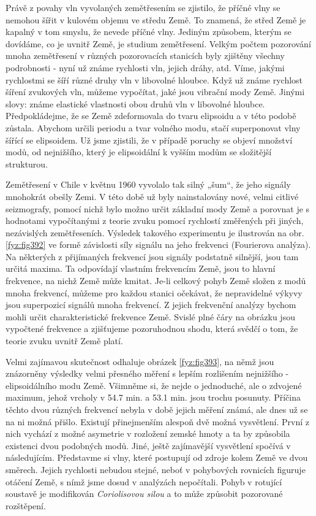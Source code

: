   Právě z povahy vln vyvolaných zemětřesením se zjistilo, že příčné vlny se nemohou šířit v kulovém 
  objemu ve středu Země. To znamená, že střed Země je kapalný v tom smyslu, že nevede příčné vlny. 
  Jediným způsobem, kterým se dovídáme, co je uvnitř Země, je studium zemětřesení. Velkým počtem 
  pozorování mnoha zemětřesení v různých pozorovacích stanicích byly zjištěny všechny podrobnosti - 
  nyní už známe rychlosti vln, jejich dráhy, atd. Víme, jakými rychlostmi se šíří různé druhy vln v 
  libovolné hloubce. Když už známe rychlost šíření zvukových vln, můžeme vypočítat, jaké jsou 
  vibrační mody Země. Jinými slovy: známe elastické vlastnosti obou druhů vln v libovolné hloubce. 
  Předpokládejme, že se Země zdeformovala do tvaru elipsoidu a v této podobě zůstala. Abychom 
  určili periodu a tvar volného modu, stačí superponovat vlny šířící se elipsoidem. Už jsme 
  zjistili, že v případě poruchy se objeví množství modů, od nejnižšího, který je elipsoidální k 
  vyšším modům se složitější strukturou.
  
  Zemětřesení v Chile v květnu 1960 vyvolalo tak silný „šum“, že jeho signály mnohokrát obešly 
  Zemi. V této době už byly nainstalovány nové, velmi citlivé seizmografy, pomocí nichž bylo možno 
  určit základní mody Země a porovnat je s hodnotami vypočítanými z teorie zvuku pomocí rychlostí 
  změřených při jiných, nezávislých zemětřeseních. Výsledek takového experimentu je ilustrován na 
  obr. \ref{fyz:fig392} ve formě závislosti síly signálu na jeho frekvenci (Fourierova analýza). Na 
  některých z přijímaných frekvencí jsou signály podstatně silnější, jsou tam určitá maxima. Ta 
  odpovídají vlastním frekvencím Země, jsou to hlavní frekvence, na nichž Země může kmitat. Je-li 
  celkový pohyb Země složen z modů mnoha frekvencí, můžeme pro každou stanici očekávat, že 
  nepravidelné výkyvy jsou superpozicí signálů mnoha frekvencí. Z jejich frekvenční analýzy bychom 
  mohli určit charakteristické frekvence Země. Svislé plné čáry na obrázku jsou vypočtené frekvence 
  a zjišťujeme pozoruhodnou shodu, která svědčí o tom, že teorie zvuku uvnitř Země platí.
  
  Velmi zajímavou skutečnost odhaluje obrázek \ref{fyz:fig393}, na němž jsou znázorněny výsledky 
  velmi přesného měření s lepším rozlišením nejnižšího - elipsoidálního modu Země. Všimněme si, že 
  nejde o jednoduché, ale o zdvojené maximum, jehož vrcholy v \num{54.7} min. a \num{53.1} min. 
  jsou trochu posunuty. Příčina těchto dvou různých frekvencí nebyla v době jejich měření známá, 
  ale dnes už se na ni možná přišlo. Existují přinejmenším alespoň dvě možná vysvětlení. První z 
  nich vychází z možné asymetrie v rozložení zemské hmoty a ta by způsobila existenci dvou 
  podobných modů. Jiné, ještě zajímavější vysvětlení spočívá v následujícím. Představme si vlny, 
  které postupují od zdroje kolem Země ve dvou směrech. Jejich rychlosti nebudou stejné, neboť v 
  pohybových rovnicích figuruje otáčení Země, s nímž jsme dosud v analýzách nepočítali. Pohyb v 
  rotující soustavě je modifikován \emph{Coriolisovou silou} a to může způsobit pozorované 
  rozštěpení.

